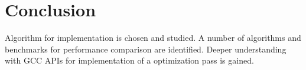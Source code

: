 \chapter{Conclusion}

Algorithm for implementation is chosen and studied. A number of algorithms and benchmarks for performance comparison are identified. Deeper understanding with GCC APIs for implementation of a optimization pass is gained.
